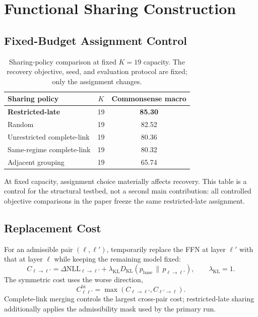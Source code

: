 \documentclass{article}
\newcommand{\KL}{\mathrm{KL}}
\newcommand{\NLL}{\mathrm{NLL}}
\theoremstyle{plain}
\theoremstyle{definition}
\theoremstyle{remark}
\begin{document}
\FloatBarrier
\section{Functional Sharing Construction}
\label{app:grouping}


\subsection{Fixed-Budget Assignment Control}
\label{app:sharing-control}

\begin{table}[H]
\caption{Sharing-policy comparison at fixed $K=19$ capacity.  The recovery
objective, seed, and evaluation protocol are fixed; only the assignment changes.}
\label{tab:app-sharing-policy}
\centering
\small
\setlength{\tabcolsep}{10pt}
\begin{tabular}{@{}lcc@{}}
\toprule
\textbf{Sharing policy} & \textbf{$K$} & \textbf{Commonsense macro}\\
\midrule
\textbf{Restricted-late} & 19 & \textbf{85.30}\\
Random & 19 & 82.52\\
Unrestricted complete-link & 19 & 80.36\\
Same-regime complete-link & 19 & 80.32\\
Adjacent grouping & 19 & 65.74\\
\bottomrule
\end{tabular}
\end{table}

At fixed capacity, assignment choice materially affects recovery.  This table is a
control for the structural testbed, not a second main contribution: all controlled
objective comparisons in the paper freeze the same restricted-late assignment.

\subsection{Replacement Cost}
For an admissible pair $(\ell,\ell')$, temporarily replace the FFN at layer
$\ell'$ with that at layer $\ell$ while keeping the remaining model fixed:
\begin{equation}
  C_{\ell\to\ell'}
  = \Delta\NLL_{\ell\to\ell'}
  + \lambda_{\KL}D_{\KL}\!\left(p_{\mathrm{base}}\,\|\,
  p_{\ell\to\ell'}\right),\qquad \lambda_{\KL}=1.
  \label{eq:app-replacement-cost}
\end{equation}
The symmetric cost uses the worse direction,
\begin{equation}
  C^{\mathrm{bi}}_{\ell\ell'}
  =\max\!\left(C_{\ell\to\ell'},C_{\ell'\to\ell}\right).
  \label{eq:app-bidirectional-cost}
\end{equation}
Complete-link merging controls the largest cross-pair cost; restricted-late
sharing additionally applies the admissibility mask used by the primary run.
\end{document}

